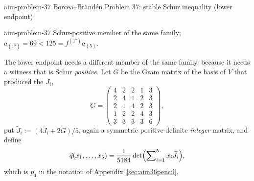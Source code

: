\begin{cxsummary}{aim-problem-37}
Borcea--Br\"and\'en Problem 37: stable Schur inequality (lower endpoint) \citeyearpar{AIMStableProblems}
\end{cxsummary}

\begin{cxcertificate}{aim-problem-37}
Schur-positive member of the same family; $a_{(1^5)}=69<125=f^{(1^5)}a_{(5)}$.
\end{cxcertificate}


\begin{cxrefutation}
The lower endpoint needs a different member of the same family, because it needs a witness that is Schur \emph{positive}.  Let $G$ be the Gram matrix of the basis of $V$ that produced the $J_i$,
\[
G=\begin{pmatrix}
4&2&2&1&3\\
2&4&1&2&3\\
2&1&4&2&3\\
1&2&2&4&3\\
3&3&3&3&6
\end{pmatrix},
\]
put $\widetilde J_i:=(4J_i+2G)/5$, again a symmetric positive-definite \emph{integer} matrix, %
and define
\begin{equation}\label{eq:aim36-qtilde}
\widetilde q(x_1,\ldots,x_5)=\frac1{5184}\det\Bigl(\sum\nolimits_{i=1}^5x_i\widetilde J_i\Bigr),
\end{equation}
which is $p_4$ in the notation of Appendix~\ref{sec:aim36pencil}.


\end{cxrefutation}
